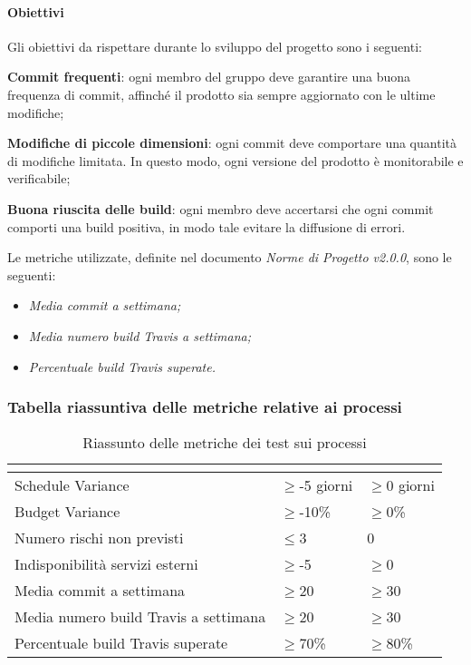 \paragraph{Obiettivi} \Spazio
Gli obiettivi da rispettare durante lo sviluppo del progetto sono i seguenti:
\begin{itemize}
	\item{\textbf{Commit frequenti}: ogni membro del gruppo deve garantire una buona frequenza di commit, affinché il prodotto sia sempre aggiornato con le ultime modifiche;
	\item{\textbf{Modifiche di piccole dimensioni}: ogni commit deve comportare una quantità di modifiche limitata. In questo modo, ogni versione del prodotto è monitorabile e verificabile;}
	\item{\textbf{Buona riuscita delle build}: ogni membro deve accertarsi che ogni commit comporti una build positiva, in modo tale evitare la diffusione di errori.}
	}
\end{itemize}
Le metriche utilizzate, definite nel documento \emph{Norme di Progetto v2.0.0}, sono le seguenti:
\begin{itemize}
	\item\emph{Media commit a settimana;}
	\item\emph{Media numero build Travis a settimana;}
	\item\emph{Percentuale build Travis superate.}
\end{itemize}

\subsubsection{Tabella riassuntiva delle metriche relative ai processi}
\renewcommand{\arraystretch}{1.5}
\begin{table}[H]
	\centering
	\begin{tabular}{|C{5cm}|C{4cm}|C{4cm}|}
		\hline
		\textbf{\color{title_text}{Nome Metrica}} &  \textbf{\color{title_text}{Range accettabile}} & \textbf{\color{title_text}{Range ottimale}} \\ \hline
		Schedule Variance & $\geq$-5 giorni  & $\geq$0 giorni \\ \hline
		Budget Variance&$\geq$-10\% &$\geq$0\% \\ \hline
		Numero rischi non previsti&$\leq$3 & 0 \\ \hline
		Indisponibilità servizi esterni&$\geq$-5 &$\geq$0 \\ \hline
		Media commit a settimana&$\geq$20 &$\geq$30 \\ \hline
		Media numero build Travis a settimana&$\geq$20 &$\geq$30 \\ \hline
		Percentuale build Travis superate& $\geq$70\% &$\geq$80\% \\ \hline
	\end{tabular}
	\caption{Riassunto delle metriche dei test sui processi}
	\label{tabella:riassunto metriche dei test sui processi}
\end{table}
\renewcommand{\arraystretch}{1}

